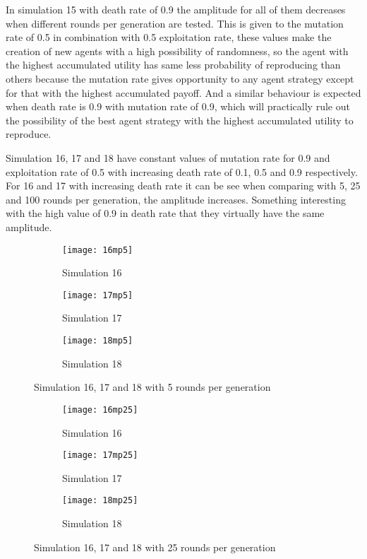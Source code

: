 In simulation 15 with death rate of 0.9 the amplitude for all of them decreases when different rounds per generation are tested. This is given to the mutation rate of 0.5 in combination with 0.5 exploitation rate, these values make the creation of new agents with a high possibility of randomness, so the agent with the highest accumulated utility has same less probability of reproducing than others because the mutation rate gives opportunity to any agent strategy except for that with the highest accumulated payoff. And a similar behaviour is expected when death rate is 0.9 with mutation rate of 0.9, which will practically rule out the possibility of the best agent strategy with the highest accumulated utility to reproduce.

Simulation 16, 17 and 18  have constant values of mutation rate for 0.9 and exploitation rate of 0.5 with increasing death rate of 0.1, 0.5 and 0.9 respectively. For 16 and 17 with increasing death rate it can be see when comparing with 5, 25 and 100 rounds per generation, the amplitude increases. Something interesting with the high value of 0.9 in death rate that they virtually have the same amplitude.

\begin{figure}[H]       
    \centering
    \begin{subfigure}[b]{0.3\textwidth}
	\centering
	{\texttt{[image: 16mp5]}}   
    	\caption{Simulation 16}
	\label{fig:mpsim165}
    \end{subfigure}
    \hfill
    \begin{subfigure}[b]{0.3\textwidth}
	\centering
	{\texttt{[image: 17mp5]}}   
    	\caption{Simulation 17}
	\label{fig:mpsim175}
    \end{subfigure}
    \hfill
    \begin{subfigure}[b]{0.3\textwidth}
	\centering
	{\texttt{[image: 18mp5]}}   
    	\caption{Simulation 18}
	\label{fig:mpsim185}
    \end{subfigure}
    \caption{Simulation 16, 17 and 18 with 5 rounds per generation}
    \label{mpsim161718simulations5}
\end{figure}

\begin{figure}[H]       
    \centering
    \begin{subfigure}[b]{0.3\textwidth}
	\centering
	{\texttt{[image: 16mp25]}}   
    	\caption{Simulation 16}
	\label{fig:mpsim1625}
    \end{subfigure}
    \hfill
    \begin{subfigure}[b]{0.3\textwidth}
	\centering
	{\texttt{[image: 17mp25]}}   
    	\caption{Simulation 17}
	\label{fig:mpsim175}
    \end{subfigure}
    \hfill
    \begin{subfigure}[b]{0.3\textwidth}
	\centering
	{\texttt{[image: 18mp25]}}   
    	\caption{Simulation 18}
	\label{fig:mpsim1825}
    \end{subfigure}
    \caption{Simulation 16, 17 and 18 with 25 rounds per generation}
    \label{mpsim161718simulations25}
\end{figure}

